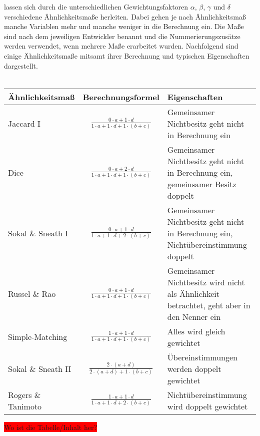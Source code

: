 lassen sich durch die unterschiedlichen Gewichtungsfaktoren $\alpha$, $\beta$, $\gamma$ und $\delta$ verschiedene \linebreak Ähnlichkeitsmaße herleiten. Dabei gehen je nach Ähnlichkeitsmaß manche Variablen mehr und manche weniger in die Berechnung ein. Die Maße sind nach dem jeweiligen Entwickler benannt und die Nummerierungszusätze werden verwendet, wenn mehrere Maße erarbeitet wurden.
Nachfolgend sind einige Ähnlichkeitsmaße mitsamt ihrer Berechnung und typischen Eigenschaften dargestellt. \\ 
\\
\begin{tabular}{|l|c|p{8cm}|}
	\hline
	\rowcolor{babyblueeyes}Ähnlichkeitsmaß & Berechnungsformel & Eigenschaften \\ \hline
	\rowcolor{beaublue}Jaccard I & $\frac{0 \cdot \textit{a} + 1 \cdot \textit{d}}{1 \cdot \textit{a} + 1 \cdot \textit{d} + 1 \cdot (\textit{b} + \textit{c})} $ & Gemeinsamer Nichtbesitz geht nicht in Berechnung ein \\ \hline
	\rowcolor{beaublue}Dice & $ \frac{0 \cdot \textit{a} + 2 \cdot \textit{d}}{1 \cdot \textit{a} + 1 \cdot \textit{d} + 1 \cdot (\textit{b} + \textit{c})} $ & Gemeinsamer Nichtbesitz geht nicht in Berechnung ein, gemeinsamer Besitz doppelt \\ \hline
	\rowcolor{beaublue}Sokal \& Sneath I & $ \frac{0 \cdot \textit{a} + 1 \cdot \textit{d}}{1 \cdot \textit{a} + 1 \cdot \textit{d} + 2 \cdot (\textit{b} + \textit{c})} $ & Gemeinsamer Nichtbesitz geht nicht in Berechnung ein, Nichtübereinstimmung doppelt \\ \hline
	\rowcolor{beaublue}Russel \& Rao & $ \frac{0 \cdot \textit{a} + 1 \cdot \textit{d}}{1 \cdot \textit{a} + 1 \cdot \textit{d} + 1 \cdot (\textit{b} + \textit{c})} $ & Gemeinsamer Nichtbesitz wird nicht als Ähnlichkeit betrachtet, geht aber in den Nenner ein \\ \hline
	\rowcolor{beaublue}Simple-Matching & $ \frac{1 \cdot \textit{a} + 1 \cdot \textit{d}}{1 \cdot \textit{a} + 1 \cdot \textit{d} + 1 \cdot (\textit{b} + \textit{c})} $ & Alles wird gleich gewichtet \\ \hline
	\rowcolor{beaublue}Sokal \& Sneath II & $ \frac{2 \cdot (\textit{a} + \textit{d})}{2 \cdot (\textit{a} + \textit{d}) + 1 \cdot (\textit{b} + \textit{c})} $ & Übereinstimmungen werden doppelt gewichtet \\ \hline
	\rowcolor{beaublue}Rogers \& Tanimoto & $ \frac{1 \cdot \textit{a} + 1 \cdot \textit{d}}{1 \cdot a + 1 \cdot \textit{d} + 2 \cdot (\textit{b} + \textit{c})} $ & Nichtübereinstimmung wird doppelt gewichtet \\ \hline
\end{tabular}
\colorbox{red}{Wo ist die Tabelle/Inhalt her?}
	

